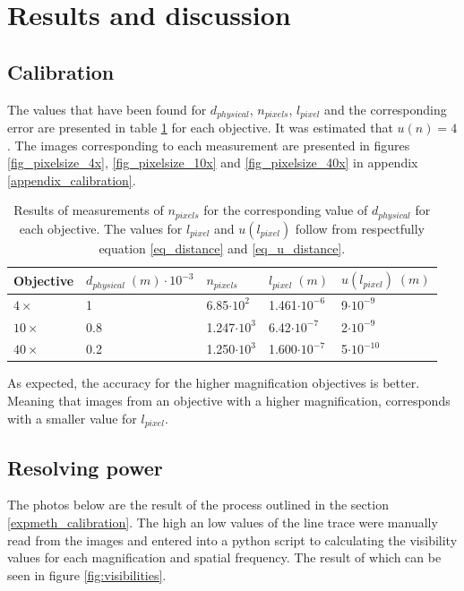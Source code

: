 \section{Results and discussion}
\subsection{Calibration}

The values that have been found for $d_{physical}$, $n_{pixels}$, $l_{pixel}$ and the corresponding error are presented in table \ref{table_pixelsize} for each objective. It was estimated that $u(n) = 4$. The images corresponding to each measurement are presented in figures \ref{fig_pixelsize_4x}, \ref{fig_pixelsize_10x} and \ref{fig_pixelsize_40x} in appendix \ref{appendix_calibration}.

\begin{table}[h!]
\centering
\captionsetup{font=small, justification = centering}
  \caption{Results of measurements of $n_{pixels}$ for the corresponding value of $d_{physical}$ for each objective. The values for $l_{pixel}$ and $u(l_{pixel})$ follow from respectfully equation \ref{eq_distance} and \ref{eq_u_distance}.}
\begin{tabular}{|l|l|l|l|l|}
\hline

Objective & $d_{physical} \; (m) \cdot 10^{-3}$ & $n_{pixels}$ & $l_{pixel} \; (m)$ & $u(l_{pixel}) \; (m)$ \\ \hline
$4\times$ & 1 & 6.85$\cdot 10^2$ & 1.461$\cdot 10^{-6}$ & 9$\cdot 10^{-9}$\\
$10\times$ & 0.8 & 1.247$\cdot 10^3$ & 6.42$\cdot 10^{-7}$ & 2$\cdot 10^{-9}$ \\
$40\times$ & 0.2 & 1.250$\cdot 10^3$ & 1.600$\cdot 10^{-7}$ & 5$\cdot 10^{-10}$ \\ \hline
\end{tabular}

\label{table_pixelsize}
\end{table}
As expected, the accuracy for the higher magnification objectives is better. Meaning that images from an objective with a higher magnification, corresponds with a smaller value for $l_{pixel}$.\\

\subsection{Resolving power}

The photos below are the result of the process outlined in the section \ref{expmeth_calibration}. The high an low values of the line trace were manually read from the images and entered into a python script to calculating the visibility values for each magnification and spatial frequency. The result of which can be seen in figure \ref{fig:visibilities}.\\

